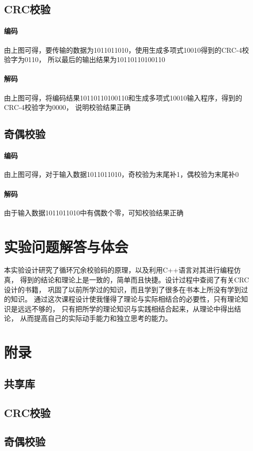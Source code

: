 \documentclass[a4paper]{ctexart}
\begin{document}
      \subsection*{CRC校验}
      \paragraph{编码}
      由上图可得，要传输的数据为1011011010，使用生成多项式10010得到的CRC-4校验字为0110，
      所以最后的输出结果为10110110100110
      \paragraph{解码}
      由上图可得，将编码结果10110110100110和生成多项式10010输入程序，得到的CRC-4校验字为0000，
      说明校验结果正确

      \subsection*{奇偶校验}
      \paragraph{编码}
      由上图可得，对于输入数据1011011010，奇校验为末尾补1，偶校验为末尾补0
      \paragraph{解码}
      由于输入数据1011011010中有偶数个零，可知校验结果正确

    \newpage
    \section{实验问题解答与体会}
    本实验设计研究了循环冗余校验码的原理，以及利用C++语言对其进行编程仿真，
    得到的结论和理论上是一致的，简单而且快捷。设计过程中查阅了有关CRC设计的书籍，
    巩固了以前所学过的知识，而且学到了很多在书本上所没有学到过的知识。
    通过这次课程设计使我懂得了理论与实际相结合的必要性，只有理论知识是远远不够的，
    只有把所学的理论知识与实践相结合起来，从理论中得出结论，
    从而提高自己的实际动手能力和独立思考的能力。

    \newpage
    \appendix
    \hypertarget{appendix}{}
    \section*{附录}

    \subsection*{共享库}
    
    
    \newpage

    \subsection*{CRC校验}
    
    \newpage

    \subsection*{奇偶校验}
    
\end{document}
